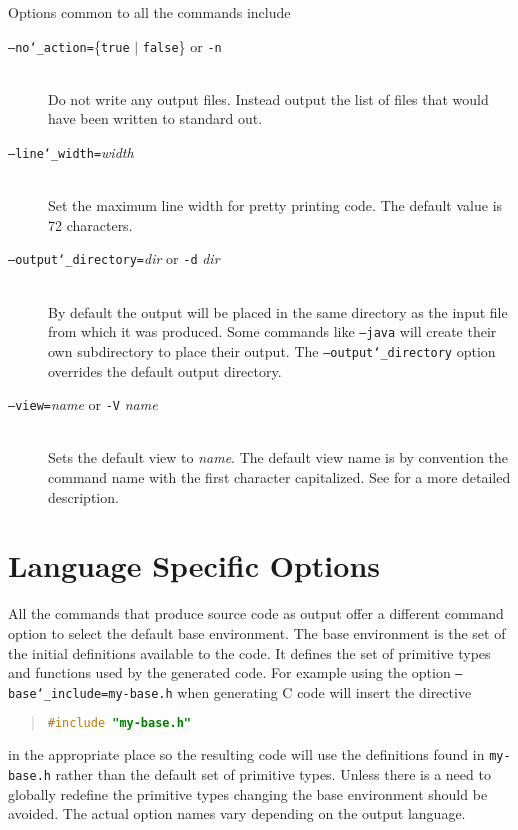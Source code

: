 Options common to all the commands include
\begin{description}
  \item[\normalfont\texttt{--no\char`\_action=}\{\texttt{true} $|$ \texttt{false}\} or \texttt{-n}] \mbox{}\\
      Do not write any output files. Instead output the list of files that would
      have been written to standard out.
  \item[\normalfont\texttt{--line\char`\_width=}\textit{width}] \mbox{}\\
    Set the maximum line width for pretty printing code. The default value
    is 72 characters.
  \item[\normalfont\texttt{--output\char`\_directory=}\textit{dir} or \texttt{-d} \textit{dir}] \mbox{}\\
    By default the output will be placed in the same directory as the
    input file from which it was produced.
    Some commands like \texttt{--java} will create their own subdirectory to
    place their output.
    The \texttt{--output\char`\_directory} option overrides the default output directory.
  \item[\normalfont\texttt{--view=}\textit{name} or \texttt{-V} \textit{name}] \mbox{}\\
    Sets the default view to \textit{name}. The default view name is by convention
    the command name with the first character capitalized. See 
    for a more detailed description.
\end{description}%

\section{Language Specific Options}
\label{sec:language-specific-options}

All the commands that produce source code as output offer a different
command option to select the default base environment.
The base environment is the set of the initial definitions available to the code.
It defines the set of primitive types and functions used by the generated code.
For example using the option \texttt{--base\char`\_include=my-base.h}
when generating C code will insert the directive
\begin{quote}\begin{lstlisting}[language=c]
#include "my-base.h"
\end{lstlisting}\end{quote}%
in the appropriate place so the resulting code will use the definitions found in
\texttt{my-base.h} rather than the default set of primitive types.
Unless there is a need to globally redefine
the primitive types changing the base environment should be avoided.
The actual option names vary depending on the output language.

